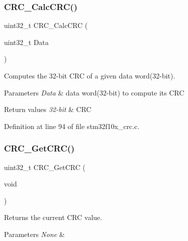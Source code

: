 \subsubsection{\texorpdfstring{C\+R\+C\+\_\+\+Calc\+C\+R\+C()}{CRC\_CalcCRC()}}
{\footnotesize\ttfamily uint32\+\_\+t C\+R\+C\+\_\+\+Calc\+C\+RC (\begin{DoxyParamCaption}\item[{uint32\+\_\+t}]{Data }\end{DoxyParamCaption})}



Computes the 32-\/bit C\+RC of a given data word(32-\/bit). 


\begin{DoxyParams}{Parameters}
{\em Data} & data word(32-\/bit) to compute its C\+RC \\
\hline
\end{DoxyParams}

\begin{DoxyRetVals}{Return values}
{\em 32-\/bit} & C\+RC \\
\hline
\end{DoxyRetVals}


Definition at line 94 of file stm32f10x\+\_\+crc.\+c.

\mbox{\label{group___c_r_c___exported___functions_gab62db4561b0558f3c8ed53887fe7de8b}} 
\subsubsection{\texorpdfstring{C\+R\+C\+\_\+\+Get\+C\+R\+C()}{CRC\_GetCRC()}}
{\footnotesize\ttfamily uint32\+\_\+t C\+R\+C\+\_\+\+Get\+C\+RC (\begin{DoxyParamCaption}\item[{void}]{ }\end{DoxyParamCaption})}



Returns the current C\+RC value. 


\begin{DoxyParams}{Parameters}
{\em None} & \\
\hline
\end{DoxyParams}

